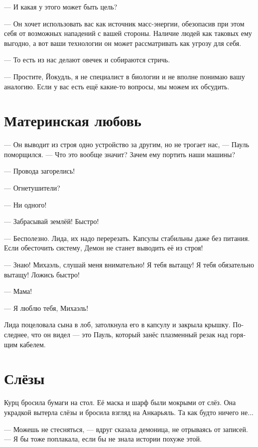 \documentclass[a4paper,10pt,fleqn]{book}\usepackage{polyglossia}\setdefaultlanguage[babelshorthands=true]{russian}\setotherlanguage{english}\defaultfontfeatures{Ligatures=TeX,Mapping=tex-text}\usepackage{xcolor}\newcommand{\ml}[3]{#2}
\newcommand{\asterism}{\vspace{1em}{\centering\Large\bfseries$\ast~\ast~\ast$\par}\vspace{1em}}
\begin{document}
--- И какая у этого может быть цель?

--- Он хочет использовать вас как источник масс-энергии, обезопасив при этом себя от возможных нападений с вашей стороны.
Наличие людей как таковых ему выгодно, а вот ваши технологии он может рассматривать как угрозу для себя.

\ml{$0$}
{--- То есть из нас делают овечек и собираются стричь.}
{``So it will try to turn us into sheeps to shear.''}

\ml{$0$}
{--- Простите, Йокудль, я не специалист в биологии и не вполне понимаю вашу аналогию.}
{``I'm sorry, Jökull, I'm not an expert in biology, so I'm not sure I properly understand your analogy.}
Если у вас есть ещё какие-то вопросы, мы можем их обсудить.

\section{Материнская любовь}

--- Он выводит из строя одно устройство за другим, но не трогает нас, --- Пауль поморщился.
--- Что это вообще значит?
Зачем ему портить наши машины?

\asterism

--- Провода загорелись!

--- Огнетушители?

--- Ни одного!

--- Забрасывай землёй!
Быстро!

--- Бесполезно.
Лида, их надо перерезать.
Капсулы стабильны даже без питания.
Если обесточить систему, Демон не станет выводить её из строя!

--- Знаю!
Михаэль, слушай меня внимательно!
Я тебя вытащу!
Я тебя обязательно вытащу!
Ложись быстро!

--- Мама!

--- Я люблю тебя, Михаэль!

Лида поцеловала сына в лоб, затолкнула его в капсулу и закрыла крышку.
Последнее, что он видел --- это Пауль, который занёс плазменный резак над горящим кабелем.

\section{Слёзы}

Курц бросила бумаги на стол.
Её маска и шарф были мокрыми от слёз.
Она украдкой вытерла слёзы и бросила взгляд на Анкарьяль.
Та как будто ничего не...

--- Можешь не стесняться, --- вдруг сказала демоница, не отрываясь от записей.
--- Я бы тоже поплакала, если бы не знала истории похуже этой.
\end{document}
